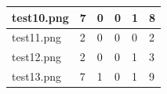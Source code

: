 \documentclass[a4paper,12pt]{article}
\begin{document}
\begin{table}[H]
\begin{tabular}{llllll}
		\multicolumn{1}{|l|}{test10.png}                                                                       & \multicolumn{1}{l|}{7}                                                                 & \multicolumn{1}{l|}{0}                                                                  & \multicolumn{1}{l|}{0}                                                                  & \multicolumn{1}{l|}{1}                                                                                      & \multicolumn{1}{l|}{8}                                                                                             \\ \hline
		\multicolumn{1}{|l|}{test11.png}                                                                       & \multicolumn{1}{l|}{2}                                                                 & \multicolumn{1}{l|}{0}                                                                  & \multicolumn{1}{l|}{0}                                                                  & \multicolumn{1}{l|}{0}                                                                                      & \multicolumn{1}{l|}{2}                                                                                             \\ \hline
		\multicolumn{1}{|l|}{test12.png}                                                                       & \multicolumn{1}{l|}{2}                                                                 & \multicolumn{1}{l|}{0}                                                                  & \multicolumn{1}{l|}{0}                                                                  & \multicolumn{1}{l|}{1}                                                                                      & \multicolumn{1}{l|}{3}                                                                                             \\ \hline
		\multicolumn{1}{|l|}{test13.png}                                                                       & \multicolumn{1}{l|}{7}                                                                 & \multicolumn{1}{l|}{1}                                                                  & \multicolumn{1}{l|}{0}                                                                  & \multicolumn{1}{l|}{1}                                                                                      & \multicolumn{1}{l|}{9}                                                                                             \\ \hline

\end{tabular}
\end{table}
\end{document}
